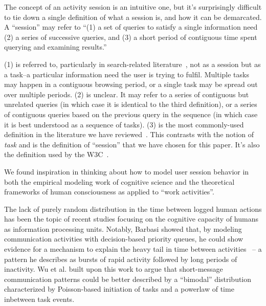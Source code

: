The concept of an activity session is an intuitive one, but it's surprisingly difficult to tie down a single definition of what a session is, and how it can be demarcated.  A ``session'' may refer to ``(1) a set of queries to satisfy a single information need (2) a series of successive queries, and (3) a short period of contiguous time spent querying and examining results.''~\cite{jones2008beyond}

(1) is referred to, particularly in search-related literature~\cite{eickhoff2014lessons,jones2008beyond}, not as a session but as a task--a particular information need the user is trying to fulfil.  Multiple tasks may happen in a contiguous browsing period, or a single task may be spread out over multiple periods.
(2) is unclear. It may refer to a series of contiguous but unrelated queries (in which case it is identical to the third definition), or a series of contiguous queries based on the previous query in the sequence (in which case it is best understood as a sequence of tasks).
(3) is the most commonly-used definition in the literature we have reviewed~\cite{govseva2006empirical,nadjarbashi2004improving,spiliopoulou2003framework,white2010assessing}. This contrasts with the notion of \emph{task} and is the definition of ``session'' that we have chosen for this paper. It's also the definition used by the W3C~\cite{W3C1999}.

We found inspiration in thinking about how to model user session behavior in both the empirical modeling work of cognitive science and the theoretical frameworks of human consciousness as applied to ``work activities''.
 
The lack of purely random distribution in the time between logged human actions has been the topic of recent studies focusing on the cognitive capacity of humans as information processing units.  Notably, Barbasi showed that, by modeling communication activities with decision-based priority queues, he could show evidence for a mechanism to explain the heavy tail in time between activities~\cite{barabasi2005origin} -- a pattern he describes as bursts of rapid activity followed by long periods of inactivity.  Wu et al. built upon this work to argue that short-message communication patterns could be better described by a ``bimodal'' distribution characterized by Poisson-based initiation of tasks and a powerlaw of time inbetween task events\cite{wu2010evidence}.

